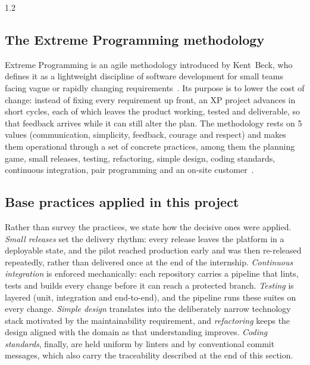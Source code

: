 \begin{spacing}{1.2}
\subsection{The Extreme Programming methodology}
Extreme Programming is an agile methodology introduced by Kent~Beck,
who defines it as a lightweight discipline of software development for
small teams facing vague or rapidly changing
requirements~\cite{Beck2004}. Its purpose is to lower the cost of
change: instead of fixing every requirement up front, an XP project
advances in short cycles, each of which leaves the product working,
tested and deliverable, so that feedback arrives while it can still
alter the plan. The methodology rests on 5 values (communication,
simplicity, feedback, courage and respect) and makes them operational
through a set of concrete practices, among them the planning game,
small releases, testing, refactoring, simple design, coding standards,
continuous integration, pair programming and an on-site
customer~\cite{Beck2004}.

\subsection{Base practices applied in this project}
Rather than survey the practices, we state how the decisive ones were
applied. \textit{Small releases} set the delivery rhythm: every release
leaves the platform in a deployable state, and the pilot reached
production early and was then re-released repeatedly, rather than
delivered once at the end of the internship. \textit{Continuous
integration} is enforced mechanically: each repository carries a
pipeline that lints, tests and builds every change before it can reach
a protected branch. \textit{Testing} is layered (unit, integration
and end-to-end), and the pipeline runs these suites on every change.
\textit{Simple design} translates into the deliberately narrow
technology stack motivated by the maintainability requirement, and
\textit{refactoring} keeps the design aligned with the domain as that
understanding improves. \textit{Coding standards}, finally, are held uniform
by linters and by conventional commit messages, which also carry the
traceability described at the end of this section.


\end{spacing}
